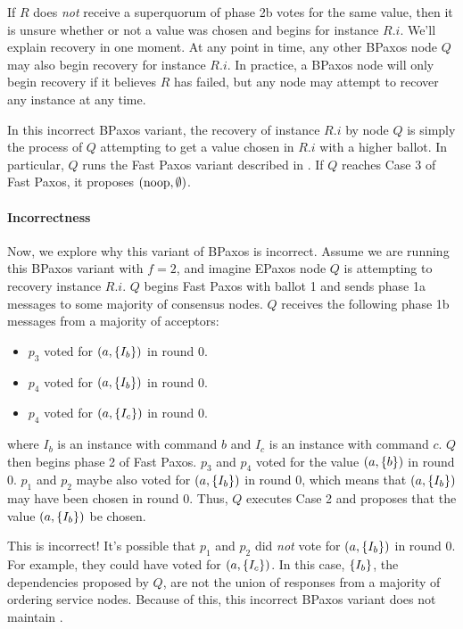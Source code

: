If $R$ does \emph{not} receive a superquorum of phase 2b votes for the same
value, then it is unsure whether or not a value was chosen and begins
 for instance $R.i$. We'll explain recovery in one moment. At
any point in time, any other BPaxos node $Q$ may also begin recovery for
instance $R.i$. In practice, a BPaxos node will only begin recovery if it
believes $R$ has failed, but any node may attempt to recover any instance at
any time.

In this incorrect BPaxos variant, the recovery of instance $R.i$ by node $Q$ is
simply the process of $Q$ attempting to get a value chosen in $R.i$ with a
higher ballot. In particular, $Q$ runs the Fast Paxos variant described in
. If $Q$ reaches Case 3 of Fast Paxos, it proposes $(\text{noop},
\emptyset)$.

\paragraph{Incorrectness}
Now, we explore why this variant of BPaxos is incorrect. Assume we are running
this BPaxos variant with $f = 2$, and imagine EPaxos node $Q$ is attempting to
recovery instance $R.i$. $Q$ begins Fast Paxos with ballot 1 and sends phase 1a
messages to some majority of consensus nodes. $Q$ receives the following phase
1b messages from a majority of acceptors:
\begin{itemize}
  \item
    $p_3$ voted for $(a, \{I_b\})$ in round $0$.
  \item
    $p_4$ voted for $(a, \{I_b\})$ in round $0$.
  \item
    $p_4$ voted for $(a, \{I_c\})$ in round $0$.
\end{itemize}
where $I_b$ is an instance with command $b$ and $I_c$ is an instance with
command $c$.
%
$Q$ then begins phase 2 of Fast Paxos. $p_3$ and $p_4$ voted for the value $(a,
\{b\})$ in round $0$. $p_1$ and $p_2$ maybe also voted for $(a, \{I_b\})$
in round $0$, which means that $(a, \{I_b\})$ may have been chosen in round
$0$. Thus, $Q$ executes Case 2 and proposes that the value $(a, \{I_b\})$ be
chosen.

This is incorrect! It's possible that $p_1$ and $p_2$ did \emph{not} vote for
$(a, \{I_b\})$ in round $0$. For example, they could have voted for $(a,
\{I_c\})$. In this case, $\{I_b\}$, the dependencies proposed by $Q$, are
not the union of responses from a majority of ordering service nodes. Because
of this, this incorrect BPaxos variant does not maintain
.

